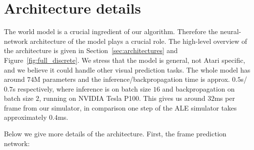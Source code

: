\onecolumn
\newpage

\section{Architecture details}\label{sec:architecture-details}
The world model is a crucial ingredient of our algorithm. Therefore the neural-network architecture of the model plays a crucial role. The high-level overview of the architecture is given in Section~\ref{sec:architectures} and Figure~\ref{fig:full_discrete}. We stress that the model is general, not Atari specific, and we believe it could handle other visual prediction tasks. The whole model has around $74$M parameters and the inference/backpropagation time is approx. $0.5$s/$0.7$s respectively, where inference is on batch size $16$ and backpropagation on batch size $2$, running on NVIDIA Tesla P100.
This gives us around $32$ms per frame from our simulator, in comparison one step of the ALE simulator takes approximately $0.4$ms.

Below we give more details of the architecture. First, the frame prediction network:

